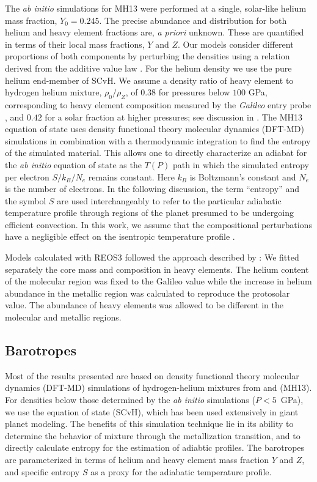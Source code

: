 The \textit{ab initio} simulations for MH13 were performed at a single, solar-like
helium mass fraction, $Y_0=0.245$. The precise abundance and distribution for both
helium and heavy element fractions are, \textit{a priori} unknown.  These are
quantified in terms of their local mass fractions, $Y$ and  $Z$. Our models consider
different proportions of both components by perturbing the densities using a relation
derived from the additive value law \citep{hubbard2016}. For the helium density we
use the pure helium end-member of SCvH. We assume a density ratio of heavy element to
hydrogen helium mixture,  $\rho_0 / \rho_Z$, of  $0.38$ for pressures below $100$
GPa, corresponding to heavy element composition measured by the \textit{Galileo}
entry probe \citep{Wong2004}, and $0.42$ for a solar fraction at higher pressures;
see discussion in \citet{hubbard2016}.  
The MH13 equation of state  uses density functional theory molecular dynamics
(DFT-MD) simulations in combination with a thermodynamic integration to find the
entropy of the simulated material. This allows one to directly characterize an
adiabat for the \textit{ab initio} equation of state as the $T(P)$ path in which the
simulated entropy per electron $S/k_B/N_e$ remains constant.  Here $k_B$ is
Boltzmann's constant and $N_e$ is the number of electrons. In the following
discussion, the term ``entropy'' and the symbol $S$ are used interchangeably to refer
to the particular adiabatic temperature profile through regions of the planet
presumed to be undergoing efficient convection. In this work, we assume that the
compositional perturbations have a negligible effect on the isentropic temperature
profile \citep{Soubiran2016}.



Models calculated with REOS3 followed the approach described by
\citet{miguel2016}: We fitted separately the core mass and composition
in heavy elements. The helium content of the molecular region was
fixed to the Galileo value while the increase in helium abundance in
the metallic region was calculated to reproduce the protosolar
value. The abundance of heavy elements was allowed to be different in
the molecular and metallic regions.   


\subsection{Barotropes} \label{sec:barotropes}

Most of the results presented are based on  density functional theory molecular
dynamics (DFT-MD) simulations of hydrogen-helium mixtures from
\citet{militzer2013a} and \citet{militzer2013b} (MH13).  For densities below
those determined by the \textit{ab initio} simulations ($P<5$~GPa), we use the
\citet{saumon1995} equation of state (SCvH), which has been used extensively in
giant planet modeling. The benefits of this simulation technique lie in its
ability to determine the behavior of mixture through the metallization
transition, and to directly calculate entropy for the estimation of adiabtic
profiles. The barotropes are parameterized in
terms of helium and heavy element mass fraction $Y$ and $Z$, and specific
entropy $S$ as a proxy for the adiabatic temperature profile.

